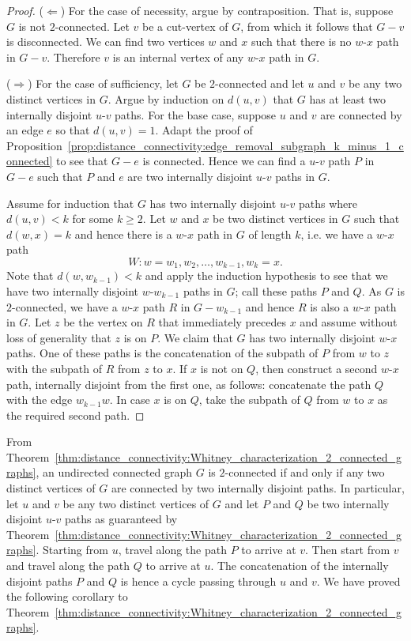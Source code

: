 \begin{proof}
($\Longleftarrow$)
For the case of necessity, argue by contraposition. That is, suppose
$G$ is not $2$-connected. Let $v$ be a cut-vertex of $G$, from which
it follows that $G - v$ is disconnected. We can find two vertices $w$
and $x$ such that there is no $w$-$x$ path in $G - v$. Therefore $v$
is an internal vertex of any $w$-$x$ path in $G$.

($\Longrightarrow$)
For the case of sufficiency, let $G$ be $2$-connected and let $u$ and
$v$ be any two distinct vertices in $G$. Argue by induction on
$d(u,v)$ that $G$ has at least two internally disjoint $u$-$v$
paths. For the base case, suppose $u$ and $v$ are connected by an edge
$e$ so that $d(u,v) = 1$. Adapt the proof of
Proposition~\ref{prop:distance_connectivity:edge_removal_subgraph_k_minus_1_connected}
to see that $G - e$ is connected. Hence we can find a $u$-$v$ path $P$
in $G - e$ such that $P$ and $e$ are two internally disjoint $u$-$v$
paths in $G$.

Assume for induction that $G$ has two internally disjoint $u$-$v$
paths where $d(u,v) < k$ for some $k \geq 2$. Let $w$ and $x$ be two
distinct vertices in $G$ such that $d(w,x) = k$ and hence there is a
$w$-$x$ path in $G$ of length $k$, i.e. we have a $w$-$x$ path
\[
W: w = w_1, w_2, \dots, w_{k-1}, w_k = x.
\]
Note that $d(w, w_{k-1}) < k$ and apply the induction hypothesis to
see that we have two internally disjoint $w$-$w_{k-1}$ paths in $G$;
call these paths $P$ and $Q$. As $G$ is $2$-connected, we have a
$w$-$x$ path $R$ in $G - w_{k-1}$ and hence $R$ is also a $w$-$x$ path
in $G$. Let $z$ be the vertex on $R$ that immediately precedes $x$ and
assume without loss of generality that $z$ is on $P$. We claim that
$G$ has two internally disjoint $w$-$x$ paths. One of these paths is
the concatenation of the subpath of $P$ from $w$ to $z$ with the
subpath of $R$ from $z$ to $x$. If $x$ is not on $Q$, then construct a
second $w$-$x$ path, internally disjoint from the first one, as
follows: concatenate the path $Q$ with the edge $w_{k-1} w$. In case
$x$ is on $Q$, take the subpath of $Q$ from $w$ to $x$ as the required
second path.
\end{proof}

From
Theorem~\ref{thm:distance_connectivity:Whitney_characterization_2_connected_graphs},
an undirected connected graph $G$ is $2$-connected if and only if any
two distinct vertices of $G$ are connected by two internally disjoint
paths. In particular, let $u$ and $v$ be any two distinct vertices of
$G$ and let $P$ and $Q$ be two internally disjoint $u$-$v$ paths as
guaranteed by
Theorem~\ref{thm:distance_connectivity:Whitney_characterization_2_connected_graphs}.
Starting from $u$, travel along the path $P$ to arrive at $v$. Then
start from $v$ and travel along the path $Q$ to arrive at $u$. The
concatenation of the internally disjoint paths $P$ and $Q$ is hence a
cycle passing through $u$ and $v$. We have proved the following
corollary to
Theorem~\ref{thm:distance_connectivity:Whitney_characterization_2_connected_graphs}.

